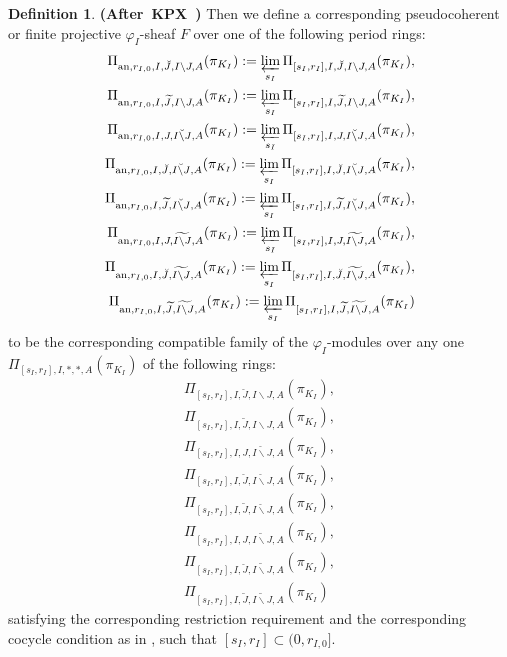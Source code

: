 \documentclass[12pt]{amsart}
\theoremstyle{definition}
\newtheorem{definition}[theorem]{Definition}
\numberwithin{equation}{section}
\begin{document}
\begin{definition} \mbox{\bf{(After KPX \cite[Definition 2.2.6]{KPX})}}
Then we define a corresponding pseudocoherent or finite projective $\varphi_I$-sheaf $F$ over one of the following period rings:
\begin{align}
\Pi_{\mathrm{an},r_{I,0},I,\breve{J},I\backslash J,A}(\pi_{K_I}):=\varprojlim_{s_I}\Pi_{[s_I,r_I],I,\breve{J},I\backslash J,A}(\pi_{K_I}),\\	
\Pi_{\mathrm{an},r_{I,0},I,\widetilde{J},I\backslash J,A}(\pi_{K_I}):=\varprojlim_{s_I} \Pi_{[s_I,r_I],I,\widetilde{J},I\backslash J,A}(\pi_{K_I}),\\
\Pi_{\mathrm{an},r_{I,0},I,J,\breve{I\backslash J},A}(\pi_{K_I}):=\varprojlim_{s_I}\Pi_{[s_I,r_I],I,J,\breve{I\backslash J},A}(\pi_{K_I}),\\	
\Pi_{\mathrm{an},r_{I,0},I,\breve{J},\breve{I\backslash J},A}(\pi_{K_I}):=\varprojlim_{s_I} \Pi_{[s_I,r_I],I,\breve{J},\breve{I\backslash J},A}(\pi_{K_I}),\\	
\Pi_{\mathrm{an},r_{I,0},I,\widetilde{J},\breve{I\backslash J},A}(\pi_{K_I}):=\varprojlim_{s_I} \Pi_{[s_I,r_I],I,\widetilde{J},\breve{I\backslash J},A}(\pi_{K_I}),\\
\Pi_{\mathrm{an},r_{I,0},I,J,\widetilde{I\backslash J},A}(\pi_{K_I}):=\varprojlim_{s_I} \Pi_{[s_I,r_I],I,J,\widetilde{I\backslash J},A}(\pi_{K_I}),\\	
\Pi_{\mathrm{an},r_{I,0},I,\breve{J},\widetilde{I\backslash J},A}(\pi_{K_I}):=\varprojlim_{s_I} \Pi_{[s_I,r_I],I,\breve{J},\widetilde{I\backslash J},A}(\pi_{K_I}),\\	
\Pi_{\mathrm{an},r_{I,0},I,\widetilde{J},\widetilde{I\backslash J},A}(\pi_{K_I}):=\varprojlim_{s_I} \Pi_{[s_I,r_I],I,\widetilde{J},\widetilde{I\backslash J},A}(\pi_{K_I})	
\end{align}	
to be the corresponding compatible family of the $\varphi_I$-modules over any one $\Pi_{[s_I,r_I],I,*,*,A}(\pi_{K_I})$ of the following rings:
\begin{align}
\Pi_{[s_I,r_I],I,\breve{J},I\backslash J,A}(\pi_{K_I}),\\	
\Pi_{[s_I,r_I],I,\widetilde{J},I\backslash J,A}(\pi_{K_I}),\\
\Pi_{[s_I,r_I],I,J,\breve{I\backslash J},A}(\pi_{K_I}),\\	
\Pi_{[s_I,r_I],I,\breve{J},\breve{I\backslash J},A}(\pi_{K_I}),\\
\Pi_{[s_I,r_I],I,\widetilde{J},\breve{I\backslash J},A}(\pi_{K_I}),\\
\Pi_{[s_I,r_I],I,J,\widetilde{I\backslash J},A}(\pi_{K_I}),\\	
\Pi_{[s_I,r_I],I,\breve{J},\widetilde{I\backslash J},A}(\pi_{K_I}),\\
\Pi_{[s_I,r_I],I,\widetilde{J},\widetilde{I\backslash J},A}(\pi_{K_I})	
\end{align}
satisfying the corresponding restriction requirement and the corresponding cocycle condition as in \cite[Definition 2.2.6]{KPX}, such that $[s_I,r_I]\subset (0,r_{I,0}]$.
\end{definition}
\end{document}
